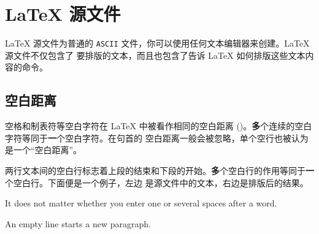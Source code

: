 \section{\LaTeX{} 源文件}


\LaTeX{} 源文件为普通的 \texttt{ASCII} 文件，你可以使用任何文本编辑器来创建。\LaTeX{} 源文件不仅包含了
要排版的文本，而且也包含了告诉 \LaTeX{} 如何排版这些文本内容的命令。

\subsection{空白距离}


空格和制表符等空白字符在 \LaTeX{} 中被看作相同的空白距离 ()。{\textbf
多}个连续的空白字符等同于\textbf{一}个空白字符。在句首的
空白距离一般会被忽略，单个空行也被认为是一个“空白距离”。



两行文本间的空白行标志着上段的结束和下段的开始。{\textbf
多}个空白行的作用等同于\textbf{一}个空白行。下面便是一个例子，左边
是源文件中的文本，右边是排版后的结果。

\begin{example}
It does not matter whether you
enter one or several     spaces
after a word.

An empty line starts a new
paragraph.
\end{example}

